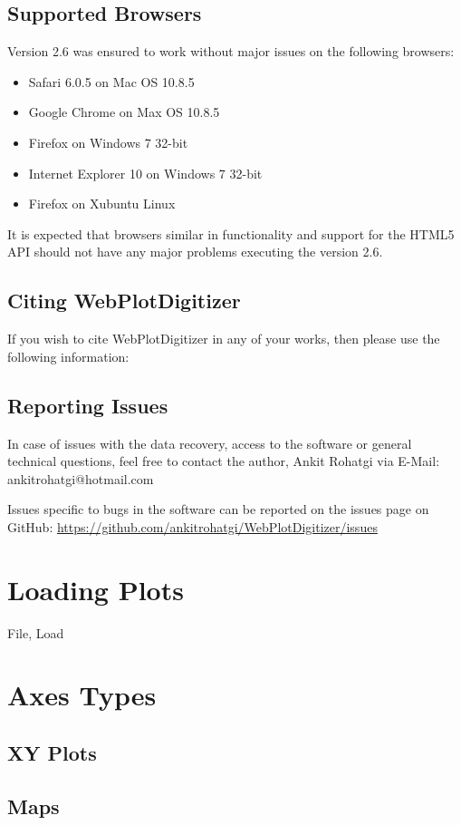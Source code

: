 \documentclass[letterpaper]{article}
\begin{document}
\subsection{Supported Browsers}
Version 2.6 was ensured to work without major issues on the following browsers:
\begin{itemize}
\item{Safari 6.0.5 on Mac OS 10.8.5}
\item{Google Chrome on Max OS 10.8.5}
\item{Firefox on Windows 7 32-bit}
\item{Internet Explorer 10 on Windows 7 32-bit}
\item{Firefox on Xubuntu Linux}
\end{itemize}
It is expected that browsers similar in functionality and support for the HTML5 API should not have any major problems executing the version 2.6.

\subsection{Citing WebPlotDigitizer}
If you wish to cite WebPlotDigitizer in any of your works, then please use the following information:

\subsection{Reporting Issues}
In case of issues with the data recovery, access to the software or general technical questions, feel free to contact the author, Ankit Rohatgi via E-Mail: ankitrohatgi@hotmail.com

Issues specific to bugs in the software can be reported on the issues page on GitHub: \url{https://github.com/ankitrohatgi/WebPlotDigitizer/issues}

\section{Loading Plots}
File, Load
\section{Axes Types}
\subsection{XY Plots}
\subsection{Maps}
\end{document}
